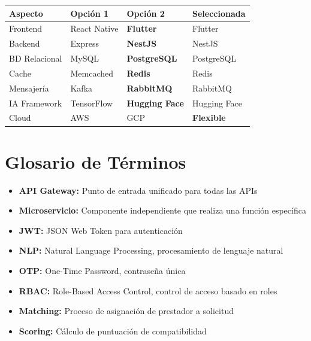 \documentclass[12pt,a4paper,spanish]{article}
\begin{document}
\begin{center}
\begin{tabular}{|l|l|l|l|}
    \toprule
    \textbf{Aspecto} & \textbf{Opción 1} & \textbf{Opción 2} & \textbf{Seleccionada} \\
    \midrule
    Frontend & React Native & \textbf{Flutter} & Flutter \\
    Backend & Express & \textbf{NestJS} & NestJS \\
    BD Relacional & MySQL & \textbf{PostgreSQL} & PostgreSQL \\
    Cache & Memcached & \textbf{Redis} & Redis \\
    Mensajería & Kafka & \textbf{RabbitMQ} & RabbitMQ \\
    IA Framework & TensorFlow & \textbf{Hugging Face} & Hugging Face \\
    Cloud & AWS & GCP & \textbf{Flexible} \\
    \bottomrule
\end{tabular}
\end{center}

\section{Glosario de Términos}

\begin{itemize}
    \item \textbf{API Gateway:} Punto de entrada unificado para todas las APIs
    \item \textbf{Microservicio:} Componente independiente que realiza una función específica
    \item \textbf{JWT:} JSON Web Token para autenticación
    \item \textbf{NLP:} Natural Language Processing, procesamiento de lenguaje natural
    \item \textbf{OTP:} One-Time Password, contraseña única
    \item \textbf{RBAC:} Role-Based Access Control, control de acceso basado en roles
    \item \textbf{Matching:} Proceso de asignación de prestador a solicitud
    \item \textbf{Scoring:} Cálculo de puntuación de compatibilidad
\end{itemize}
\end{document}
